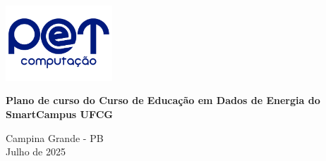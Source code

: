 \begin{titlepage}
    \centering
    
		\includegraphics[width=0.3\textwidth]{conteudo/logo-pet.png} \par
    
    \vspace*{\fill}

    {\Huge\bfseries Plano de curso do Curso de Educação em Dados de Energia do SmartCampus UFCG \par}
    \vspace{5cm}
    
    \vspace*{\fill}
    
    {\large Campina Grande - PB \\ Julho de 2025 \par}
\end{titlepage}

